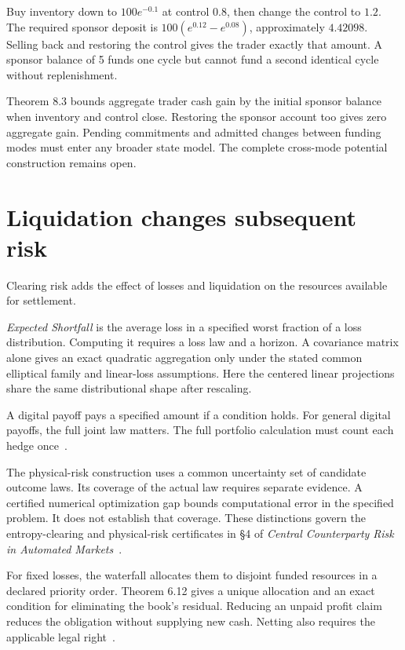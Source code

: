 \documentclass{momentum}
\begin{document}
Buy inventory down to $100e^{-0.1}$ at control $0.8$, then change the control to $1.2$. The required sponsor deposit is $100(e^{0.12}-e^{0.08})$, approximately $4.42098$. Selling back and restoring the control gives the trader exactly that amount. A sponsor balance of 5 funds one cycle but cannot fund a second identical cycle without replenishment.

Theorem 8.3 bounds aggregate trader cash gain by the initial sponsor balance when inventory and control close. Restoring the sponsor account too gives zero aggregate gain. Pending commitments and admitted changes between funding modes must enter any broader state model. The complete cross-mode potential construction remains open.

\section{Liquidation changes subsequent risk}

Clearing risk adds the effect of losses and liquidation on the resources available for settlement.

\emph{Expected Shortfall} is the average loss in a specified worst fraction of a loss distribution. Computing it requires a loss law and a horizon. A covariance matrix alone gives an exact quadratic aggregation only under the stated common elliptical family and linear-loss assumptions. Here the centered linear projections share the same distributional shape after rescaling.

A digital payoff pays a specified amount if a condition holds. For general digital payoffs, the full joint law matters. The full portfolio calculation must count each hedge once~\cite[\S3]{ccp}.

The physical-risk construction uses a common uncertainty set of candidate outcome laws. Its coverage of the actual law requires separate evidence. A certified numerical optimization gap bounds computational error in the specified problem. It does not establish that coverage. These distinctions govern the entropy-clearing and physical-risk certificates in \S4 of \emph{Central Counterparty Risk in Automated Markets}~\cite{ccp}.

For fixed losses, the waterfall allocates them to disjoint funded resources in a declared priority order. Theorem 6.12 gives a unique allocation and an exact condition for eliminating the book's residual. Reducing an unpaid profit claim reduces the obligation without supplying new cash. Netting also requires the applicable legal right~\cite[\S6]{ccp}.
\end{document}
